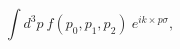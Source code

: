 \begin{equation}
  \int d^3 p~ f(p_0, p_1, p_2)~ e^{i k \times p \sigma},
\label{convergent-integral}
\end{equation}


